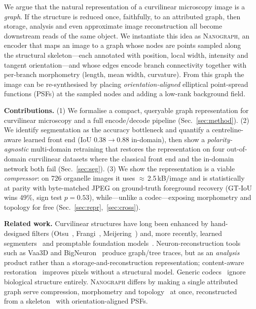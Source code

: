 \documentclass[runningheads]{llncs}
\newcommand{\method}{\textsc{Nanograph}\xspace}
\begin{document}
We argue that the natural representation of a curvilinear microscopy image is a
\emph{graph}. If the structure is reduced once, faithfully, to an attributed
graph, then storage, analysis and even approximate image reconstruction all
become downstream reads of the same object. We instantiate this idea as
\method, an encoder that maps an image to a graph whose nodes are points sampled
along the structural skeleton---each annotated with position, local width,
intensity and tangent orientation---and whose edges encode branch connectivity
together with per-branch morphometry (length, mean width, curvature). From this
graph the image can be re-synthesised by placing \emph{orientation-aligned}
elliptical point-spread functions (PSFs) at the sampled nodes and adding a
low-rank background field.

\noindent\textbf{Contributions.}
(1) We formalise a compact, queryable graph representation for curvilinear
microscopy and a full encode/decode pipeline (Sec.~\ref{sec:method}).
(2) We identify segmentation as the accuracy bottleneck and quantify a
centreline-aware learned front end (IoU $0.38\!\to\!0.88$ in-domain), then show
a \emph{polarity-agnostic} multi-domain retraining that restores the
representation on four out-of-domain curvilinear datasets where the classical
front end and the in-domain network both fail (Sec.~\ref{sec:seg}).
(3) We show the representation is a viable \emph{compressor}: on 726 organelle
images it uses $\approx$\,2.5\,kB/image and is statistically at parity with
byte-matched JPEG on ground-truth foreground recovery (GT-IoU wins 49\%, sign
test $p=0.53$), while---unlike a codec---exposing morphometry and topology for
free (Sec.~\ref{sec:repr},~\ref{sec:cross}).

\noindent\textbf{Related work.}
Curvilinear structures have long been enhanced by hand-designed filters
(Otsu~\cite{otsu}, Frangi~\cite{frangi}, Meijering~\cite{meijering}) and, more
recently, learned segmenters~\cite{unet,cldice} and promptable foundation
models~\cite{sam}. Neuron-reconstruction tools such as Vaa3D and
BigNeuron~\cite{vaa3d,bigneuron} produce graph/tree traces, but as an
\emph{analysis} product rather than a storage-and-reconstruction representation;
content-aware restoration~\cite{care} improves pixels without a structural
model. Generic codecs~\cite{jpeg} ignore biological structure entirely.
\method differs by making a single attributed graph serve compression,
morphometry and topology~\cite{persistenthomology} at once, reconstructed from a
skeleton~\cite{lee} with orientation-aligned PSFs.
\end{document}
